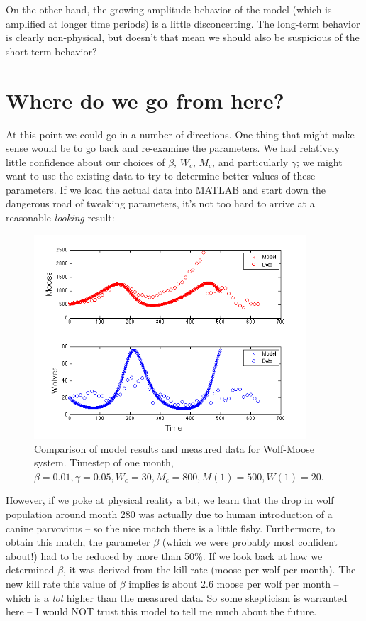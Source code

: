 \documentclass{tufte-handout}
\begin{document}
On the other hand, the growing amplitude behavior of the model (which is amplified at longer time periods) is a little disconcerting.   The long-term behavior is clearly non-physical, but doesn't that mean we should also be suspicious of the short-term behavior?

\section{Where do we go from here?}

At this point we could go in a number of directions.  One thing that might make sense would be to go back and re-examine the parameters.  We had relatively little confidence about our choices of $\beta$, $W_c$, $M_c$,  and particularly $\gamma$; we might want to use the existing data to try to determine better values of these parameters.  If we load the actual data into MATLAB and start down the dangerous road of tweaking parameters, it's not too hard to arrive at a reasonable {\it looking} result:

\begin{figure}[h!]
\includegraphics[width=4in]{figs/ModelDataComparison}
\caption{Comparison of model results and measured data  for Wolf-Moose system. Timestep of one month,  $\beta = 0.01, \gamma = 0.05, W_c = 30, M_c=800, M(1) = 500, W(1) = 20$.}
\end{figure}

However, if we poke at physical reality a bit, we learn that the drop in wolf population around month 280 was actually due to human introduction of a canine parvovirus -- so the nice match there is a little fishy.  Furthermore, to obtain this match, the parameter $\beta$ (which we were probably most confident about!) had to be reduced by more than 50\%.  If we look back at how we determined $\beta$, it was derived from the kill rate (moose per wolf per month).  The new kill rate this value of $\beta$ implies is about $2.6$ moose per wolf per month -- which is a {\it lot} higher than the measured data.  So some skepticism is warranted here -- I would NOT trust this model to tell me much about the future.
\end{document}
